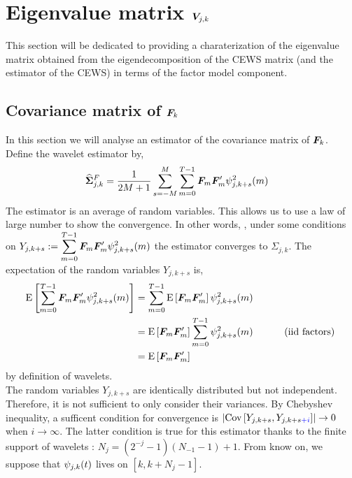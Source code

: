 \documentclass[main_document.tex]{subfiles}
\begin{document}
	\section{Eigenvalue matrix $\bm{V}_{j,k}$}
	This section will be dedicated to providing a charaterization of the eigenvalue matrix obtained from the eigendecomposition of the CEWS matrix (and the estimator of the CEWS) in terms of the factor model component. 

	\subsection{Covariance matrix of $\bm{F}_{k}$}
	In this section we will analyse an estimator of the covariance matrix of $\bm{F}_{k}$. Define the wavelet estimator by, 
\begin{align}
	\estimCovFactorWav{j}{k} &=  \frac{\displaystyle 1}{\displaystyle 2M+1} \smoothsum{s} \locsum{m} \factors{m}\factors{m}' \squaredWavelet{j}{k+s}{m} \label{eq:estimCovFWav}
\end{align} 
The estimator is an average of random variables. This allows us to use a law of large number to show the convergence. In other words, , under some conditions on $Y_{j,k+s} := \locsum{m} \factors{m}\factors{m}' \squaredWavelet{j}{k+s}{m}$ the estimator converges to $\Sigma_{j,k}$.
The expectation of the random variables $Y_{j,k+s}$ is, 
\begin{align*}
	\E{\locsum{m} \factors{m}\factors{m}' \squaredWavelet{j}{k+s}{m}} &= \locsum{m} \E{\factors{m}\factors{m}'} \squaredWavelet{j}{k+s}{m} \\
	&= \E{\factors{m}\factors{m}'} \locsum{m} \squaredWavelet{j}{k+s}{m} \hspace{1cm} \text{ (iid factors) }\\
	&=  \E{\factors{m}\factors{m}'} 
\end{align*}
by definition of wavelets. \\
The random variables $Y_{j,k+s}$ are identically distributed but not independent. Therefore, it is not sufficient to only consider their variances. By Chebyshev inequality, a sufficent condition for convergence is $\left \lvert \mathrm{Cov}\left[Y_{j,k+s},Y_{j,k+s\textcolor{blue}{+i}}\right] \right \rvert \to 0$ when $i \to \infty$. The latter condition is true for this estimator thanks to the finite support of wavelets : $N_j = (2^{-j} - 1)(N_{-1}-1)+1$. From know on, we suppose that $\psi_{j,k}(t)$ lives on $[ k , k+N_j-1 ]$.
\end{document}
